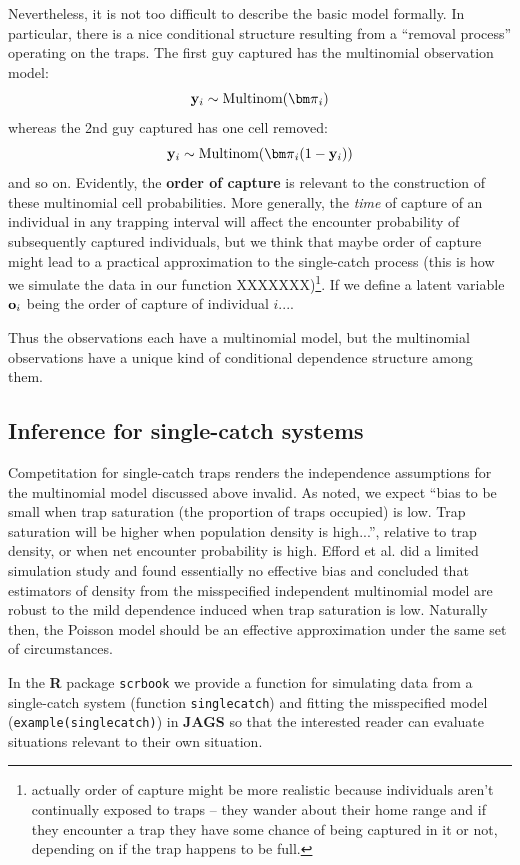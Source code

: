 Nevertheless, it is not too difficult to describe the basic model
formally. In particular, there is a nice conditional structure resulting from a ``removal
process'' operating on the traps.  The first guy captured has the 
multinomial observation model:
\[
{\bf y}_{i} \sim \mbox{Multinom}({\bm \pi}_{i})
\]
whereas the 2nd guy captured has one cell removed:
\[
{\bf y}_{i} \sim \mbox{Multinom}({\bm \pi}_{i}(1-{\bf y}_{i})    )
\]
and so on.
Evidently, the {\bf order of capture} is relevant to the construction of these
multinomial cell probabilities. More generally, the {\it time} of capture of an individual
in any trapping
interval will affect
the encounter probability of subsequently captured individuals, but we think that maybe
order of capture might lead to a practical approximation to the single-catch process
(this is how we simulate the data in our function XXXXXXX)\footnote{actually order of
capture might be more realistic because individuals aren't continually exposed to traps -- they
wander about their home range and if they encounter a trap they have some chance of being
captured in it or not, depending on if the trap happens to be full. }. 
If we define a latent variable ${\bf o}_{i}$ being 
the order of capture of individual $i$.... 

Thus the observations each have a multinomial model, but the
multinomial observations have a unique kind of conditional dependence
structure among them.

\subsection{Inference for single-catch systems}

Competitation for single-catch traps renders the independence
assumptions for the multinomial model discussed above invalid. 
As \citet{efford_etal:2009euring}
noted, 
we expect ``bias to be small when trap
saturation (the proportion of traps occupied) is low.
Trap saturation will be higher when population density is high...'',
relative to trap density, or when net encounter probability is high.
Efford et al. did a limited simulation study and found essentially no
effective bias and concluded that estimators of density from the misspecified
independent multinomial model are robust to the mild dependence induced
when trap saturation is low. 
Naturally then, the Poisson model should be an effective approximation
under the same set of circumstances. 

In the {\bf R} package \mbox{\tt scrbook} we provide a function for
simulating data from a single-catch system (function \mbox{\tt singlecatch})
and fitting the misspecified model (\mbox{\tt example(singlecatch)})
in {\bf JAGS}
so that the 
interested reader can evaluate situations relevant to their own
situation.


